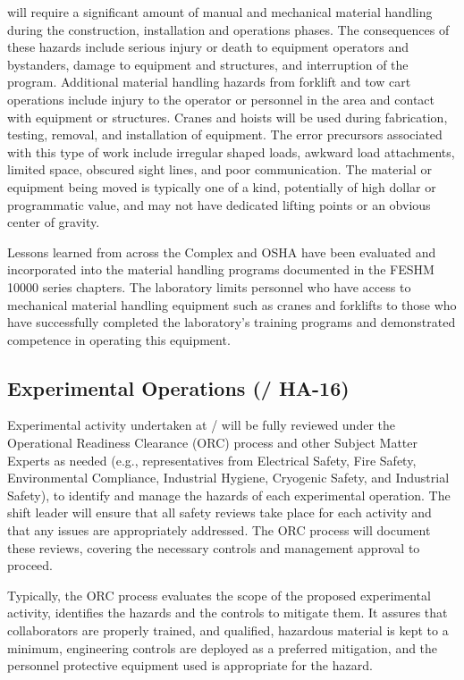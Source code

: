  will require a significant amount of manual and mechanical
material handling during the construction, installation and operations
phases.  The consequences of these hazards include serious injury or
death to equipment operators and bystanders, damage to equipment and
structures, and interruption of the program.  Additional material
handling hazards from forklift and tow cart operations include injury
to the operator or personnel in the area and contact with equipment or
structures. Cranes and hoists will be used during fabrication,
testing, removal, and installation of equipment. The error precursors
associated with this type of work include irregular shaped loads,
awkward load attachments, limited space, obscured sight lines, and
poor communication.  The material or equipment being moved is
typically one of a kind, potentially of high dollar or programmatic
value, and may not have dedicated lifting points or an obvious center
of gravity.

Lessons learned from across the  Complex and OSHA have been
evaluated and incorporated into the \fnal material handling
programs documented in the FESHM 10000 series chapters.  The
laboratory limits personnel who have access to mechanical material
handling equipment such as cranes and forklifts to those who have
successfully completed the laboratory's training programs and
demonstrated competence in operating this equipment.


\subsection{Experimental Operations (/ HA-16)}

Experimental activity undertaken at / will be fully reviewed
under the Operational Readiness Clearance (ORC) process and other
Subject Matter Experts as needed (e.g., representatives from
Electrical Safety, Fire Safety, Environmental Compliance, Industrial
Hygiene, Cryogenic Safety, and Industrial Safety), to identify and
manage the hazards of each experimental operation. The shift leader
will ensure that all safety reviews take place for each
activity and that any issues are appropriately addressed. The ORC
process will document these reviews, covering the necessary controls
and management approval to proceed.

Typically, the ORC process evaluates the scope of the proposed
experimental activity, identifies the hazards and the controls to
mitigate them. It assures that collaborators are properly trained, and
qualified, hazardous material is kept to a minimum, engineering
controls are deployed as a preferred mitigation, and the personnel
protective equipment used is appropriate for the hazard.

